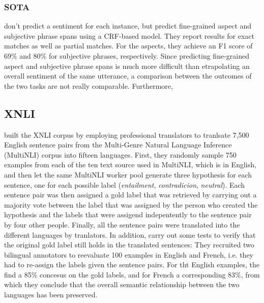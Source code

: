 \subsubsection{SOTA}

\cite{sanger2016scare} don't predict a sentiment for each instance, but predict fine-grained
aspect and subjective phrase spans using a CRF-based model.
They report results for exact matches as well as partial matches.
For the aspects, they achieve an F1 score of 69\% and 80\% for subjective phrases, respectively.
Since predicting fine-grained aspect and subjective phrase spans is much more difficult than
etrapolating an overall sentiment of the same utterance, a comparison between the outcomes of the
two tasks are not really comparable.
Furthermore,

\subsection{XNLI}

\cite{conneau2018xnli} built the XNLI corpus by employing professional translators to tranlsate
7,500 English sentence pairs from the Multi-Genre Natural Language Inference (MultiNLI) corpus
\cite{williams2017broad} into fifteen languages.
First, they randomly sample 750 examples from each of the ten text source used in MultiNLI, which
is in English, and then let the same MultiNLI worker pool generate three hypothesis for each
sentence, one for each possible label (\emph{entailment}, \emph{contradicion}, \emph{neutral}).
Each sentence pair was then assigned a gold label that was retrieved by carrying out a majority
vote between the label that was assigned by the person who created the hypothesis and the labels
that were assigend indepentently to the sentence pair by four other people.
Finally, all the sentence pairs were translated into the different languages by tranlators.
In addition, \cite{conneau2018xnli} carry out some tests to verify that the original gold label
still holds in the translated sentences:
They recruited two bilingual annotators to reevaluate 100 examples in English and French, i.e.
they had to re-assign the labels given the sentence pairs.
For tht English examples, the find a 85\% concesus on the gold labels, and for French a
corresponding 83\%, from which they conclude that the overall semantic relationship between the
two languages has been preserved.


